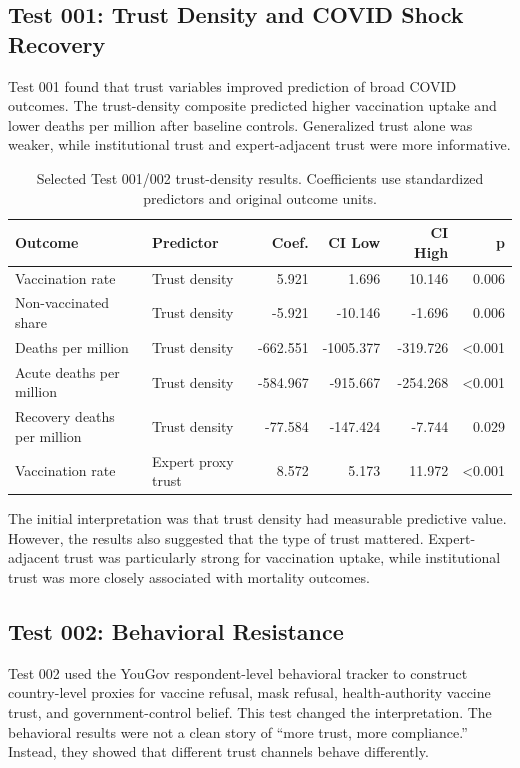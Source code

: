 \documentclass[12pt]{article}
\begin{document}
\subsection{Test 001: Trust Density and COVID Shock Recovery}

Test 001 found that trust variables improved prediction of broad COVID outcomes. The trust-density composite predicted higher vaccination uptake and lower deaths per million after baseline controls. Generalized trust alone was weaker, while institutional trust and expert-adjacent trust were more informative.

\begin{table}[htbp]
\centering
\small
\caption{Selected Test 001/002 trust-density results. Coefficients use standardized predictors and original outcome units.}
\begin{tabular}{llrrrr}
\toprule
Outcome & Predictor & Coef. & CI Low & CI High & p \\
\midrule
Vaccination rate & Trust density & 5.921 & 1.696 & 10.146 & 0.006 \\
Non-vaccinated share & Trust density & -5.921 & -10.146 & -1.696 & 0.006 \\
Deaths per million & Trust density & -662.551 & -1005.377 & -319.726 & <0.001 \\
Acute deaths per million & Trust density & -584.967 & -915.667 & -254.268 & <0.001 \\
Recovery deaths per million & Trust density & -77.584 & -147.424 & -7.744 & 0.029 \\
Vaccination rate & Expert proxy trust & 8.572 & 5.173 & 11.972 & <0.001 \\
\bottomrule
\end{tabular}
\end{table}

The initial interpretation was that trust density had measurable predictive value. However, the results also suggested that the type of trust mattered. Expert-adjacent trust was particularly strong for vaccination uptake, while institutional trust was more closely associated with mortality outcomes.

\subsection{Test 002: Behavioral Resistance}

Test 002 used the YouGov respondent-level behavioral tracker to construct country-level proxies for vaccine refusal, mask refusal, health-authority vaccine trust, and government-control belief. This test changed the interpretation. The behavioral results were not a clean story of ``more trust, more compliance.'' Instead, they showed that different trust channels behave differently.
\end{document}

